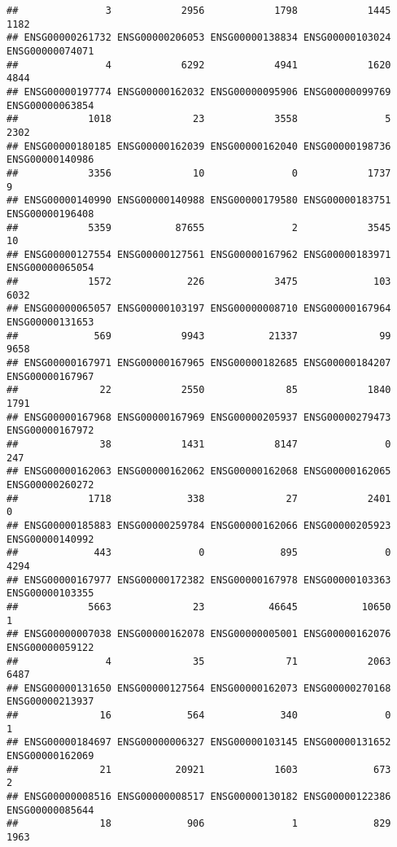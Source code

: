 \documentclass[
]{article}
\begin{document}
\begin{verbatim}
##               3            2956            1798            1445            1182 
## ENSG00000261732 ENSG00000206053 ENSG00000138834 ENSG00000103024 ENSG00000074071 
##               4            6292            4941            1620            4844 
## ENSG00000197774 ENSG00000162032 ENSG00000095906 ENSG00000099769 ENSG00000063854 
##            1018              23            3558               5            2302 
## ENSG00000180185 ENSG00000162039 ENSG00000162040 ENSG00000198736 ENSG00000140986 
##            3356              10               0            1737               9 
## ENSG00000140990 ENSG00000140988 ENSG00000179580 ENSG00000183751 ENSG00000196408 
##            5359           87655               2            3545              10 
## ENSG00000127554 ENSG00000127561 ENSG00000167962 ENSG00000183971 ENSG00000065054 
##            1572             226            3475             103            6032 
## ENSG00000065057 ENSG00000103197 ENSG00000008710 ENSG00000167964 ENSG00000131653 
##             569            9943           21337              99            9658 
## ENSG00000167971 ENSG00000167965 ENSG00000182685 ENSG00000184207 ENSG00000167967 
##              22            2550              85            1840            1791 
## ENSG00000167968 ENSG00000167969 ENSG00000205937 ENSG00000279473 ENSG00000167972 
##              38            1431            8147               0             247 
## ENSG00000162063 ENSG00000162062 ENSG00000162068 ENSG00000162065 ENSG00000260272 
##            1718             338              27            2401               0 
## ENSG00000185883 ENSG00000259784 ENSG00000162066 ENSG00000205923 ENSG00000140992 
##             443               0             895               0            4294 
## ENSG00000167977 ENSG00000172382 ENSG00000167978 ENSG00000103363 ENSG00000103355 
##            5663              23           46645           10650               1 
## ENSG00000007038 ENSG00000162078 ENSG00000005001 ENSG00000162076 ENSG00000059122 
##               4              35              71            2063            6487 
## ENSG00000131650 ENSG00000127564 ENSG00000162073 ENSG00000270168 ENSG00000213937 
##              16             564             340               0               1 
## ENSG00000184697 ENSG00000006327 ENSG00000103145 ENSG00000131652 ENSG00000162069 
##              21           20921            1603             673               2 
## ENSG00000008516 ENSG00000008517 ENSG00000130182 ENSG00000122386 ENSG00000085644 
##              18             906               1             829            1963 

\end{verbatim}
\end{document}
